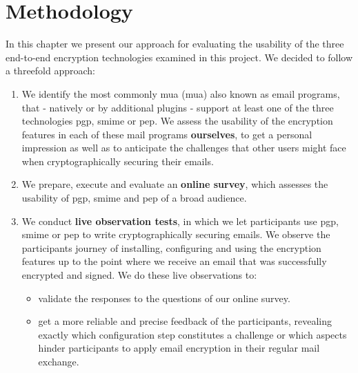 \section{Methodology}
In this chapter we present our approach for evaluating the usability of the three end-to-end encryption technologies examined in this project. We decided to follow a threefold approach:
\begin{enumerate}
	\item We identify the most commonly \acrlong{mua} (\acrshort{mua}) also known as email programs, that - natively or by additional plugins -  support at least one of the three technologies \acrshort{pgp}, \acrshort{smime} or \acrshort{pep}. We assess the usability of the encryption features in each of these mail programs \textbf{ourselves}, to get a personal impression as well as to anticipate the challenges that other users might face when cryptographically securing their emails.
	\item We prepare, execute and evaluate an \textbf{online survey}, which assesses the usability of \acrshort{pgp}, \acrshort{smime} and \acrshort{pep} of a broad audience.
	\item We conduct \textbf{live observation tests}, in which we let participants use \acrshort{pgp}, \acrshort{smime} or \acrshort{pep} to write cryptographically securing emails. We observe the participants journey of installing, configuring and using the encryption features up to the point where we receive an email that was successfully encrypted and signed. We do these live observations to:
	\begin{itemize}
		\item validate the responses to the questions of our online survey.
		\item get a more reliable and precise feedback of the participants, revealing exactly which configuration step constitutes a challenge or which aspects hinder participants to apply email encryption in their regular mail exchange.
	\end{itemize}
\end{enumerate}